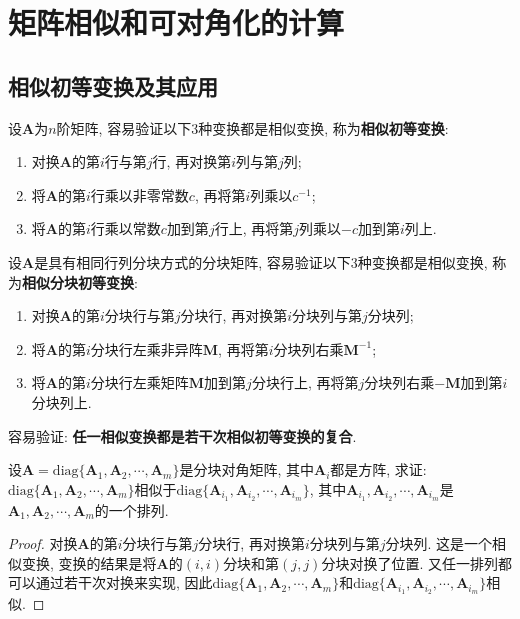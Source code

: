 \documentclass[../../main.tex]{subfiles}
\begin{document}
\section{矩阵相似和可对角化的计算}

\subsection{相似初等变换及其应用}

\begin{proposition}[相似初等变换]
设\(\boldsymbol{A}\)为\(n\)阶矩阵, 容易验证以下\(3\)种变换都是相似变换, 称为\textbf{相似初等变换}:
\begin{enumerate}
\item 对换\(\boldsymbol{A}\)的第\(i\)行与第\(j\)行, 再对换第\(i\)列与第\(j\)列;
\item 将\(\boldsymbol{A}\)的第\(i\)行乘以非零常数\(c\), 再将第\(i\)列乘以\(c^{-1}\);
\item 将\(\boldsymbol{A}\)的第\(i\)行乘以常数\(c\)加到第\(j\)行上, 再将第\(j\)列乘以\(-c\)加到第\(i\)列上.
\end{enumerate}

设\(\boldsymbol{A}\)是具有相同行列分块方式的分块矩阵, 容易验证以下\(3\)种变换都是相似变换, 称为\textbf{相似分块初等变换}:
\begin{enumerate}
\item 对换\(\boldsymbol{A}\)的第\(i\)分块行与第\(j\)分块行, 再对换第\(i\)分块列与第\(j\)分块列;
\item 将\(\boldsymbol{A}\)的第\(i\)分块行左乘非异阵\(\boldsymbol{M}\), 再将第\(i\)分块列右乘\(\boldsymbol{M}^{-1}\);
\item 将\(\boldsymbol{A}\)的第\(i\)分块行左乘矩阵\(\boldsymbol{M}\)加到第\(j\)分块行上, 再将第\(j\)分块列右乘\(-\boldsymbol{M}\)加到第\(i\)分块列上.
\end{enumerate}

容易验证: \textbf{任一相似变换都是若干次相似初等变换的复合}.
\end{proposition}


\begin{corollary}\label{example6.22}
设\(\boldsymbol{A}=\mathrm{diag}\{\boldsymbol{A}_{1},\boldsymbol{A}_{2},\cdots,\boldsymbol{A}_{m}\}\)是分块对角矩阵, 其中\(\boldsymbol{A}_{i}\)都是方阵, 求证: \(\mathrm{diag}\{\boldsymbol{A}_{1},\boldsymbol{A}_{2},\cdots,\boldsymbol{A}_{m}\}\)相似于\(\mathrm{diag}\{\boldsymbol{A}_{i_{1}},\boldsymbol{A}_{i_{2}},\cdots,\boldsymbol{A}_{i_{m}}\}\), 其中\(\boldsymbol{A}_{i_{1}},\boldsymbol{A}_{i_{2}},\cdots,\boldsymbol{A}_{i_{m}}\)是\(\boldsymbol{A}_{1},\boldsymbol{A}_{2},\cdots,\boldsymbol{A}_{m}\)的一个排列.
\end{corollary}
\begin{proof}
对换\(\boldsymbol{A}\)的第\(i\)分块行与第\(j\)分块行, 再对换第\(i\)分块列与第\(j\)分块列. 这是一个相似变换, 变换的结果是将\(\boldsymbol{A}\)的\((i,i)\)分块和第\((j,j)\)分块对换了位置. 又任一排列都可以通过若干次对换来实现, 因此\(\mathrm{diag}\{\boldsymbol{A}_{1},\boldsymbol{A}_{2},\cdots,\boldsymbol{A}_{m}\}\)和\(\mathrm{diag}\{\boldsymbol{A}_{i_{1}},\boldsymbol{A}_{i_{2}},\cdots,\boldsymbol{A}_{i_{m}}\}\)相似.
\end{proof}
\end{document}
